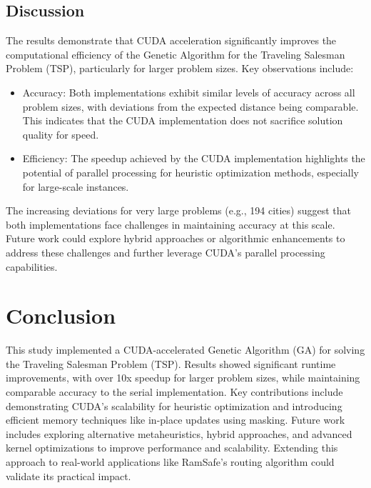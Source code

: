 \documentclass[conference]{IEEEtran}
\begin{document}
\subsection{Discussion}

The results demonstrate that CUDA acceleration significantly improves the computational efficiency of the Genetic Algorithm for the Traveling Salesman Problem (TSP), particularly for larger problem sizes. Key observations include:
\begin{itemize}
    \item Accuracy: Both implementations exhibit similar levels of accuracy across all problem sizes, with deviations from the expected distance being comparable. This indicates that the CUDA implementation does not sacrifice solution quality for speed.
    \item   Efficiency: The speedup achieved by the CUDA implementation highlights the potential of parallel processing for heuristic optimization methods, especially for large-scale instances.
\end{itemize}

The increasing deviations for very large problems (e.g., 194 cities) suggest that both implementations face challenges in maintaining accuracy at this scale. Future work could explore hybrid approaches or algorithmic enhancements to address these challenges and further leverage CUDA’s parallel processing capabilities.

\section{Conclusion}

This study implemented a CUDA-accelerated Genetic Algorithm (GA) for solving the Traveling Salesman Problem (TSP). Results showed significant runtime improvements, with over 10x speedup for larger problem sizes, while maintaining comparable accuracy to the serial implementation. Key contributions include demonstrating CUDA’s scalability for heuristic optimization and introducing efficient memory techniques like in-place updates using masking. Future work includes exploring alternative metaheuristics, hybrid approaches, and advanced kernel optimizations to improve performance and scalability. Extending this approach to real-world applications like RamSafe's routing algorithm could validate its practical impact.



\end{document}

